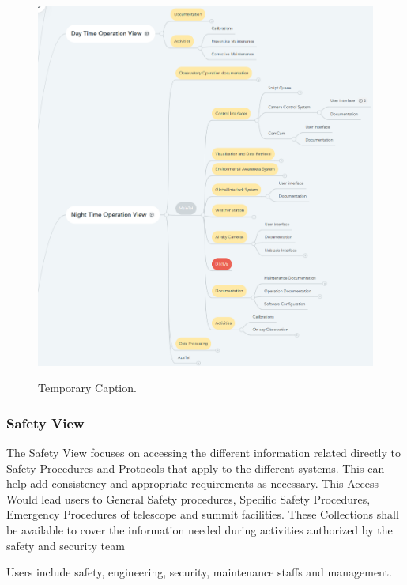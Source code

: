 \begin{figure}[ht]
\caption{Temporary Caption.}
\centering
\includegraphics[width=\textwidth]{access-veiw-day-night-operations-example-temp}
\label{fig:access-veiw-day-night-operations-example-temp}
\end{figure}

\subsubsection{Safety View}

The Safety View focuses on accessing the different information related directly to Safety Procedures and Protocols that apply to the different systems.
This can help add consistency and appropriate requirements as necessary.
This Access Would lead users to General Safety procedures, Specific Safety Procedures, Emergency Procedures of telescope and summit facilities.
These Collections shall be available to cover the information needed during activities authorized by the safety and security team

Users include safety, engineering, security, maintenance staffs and management.

